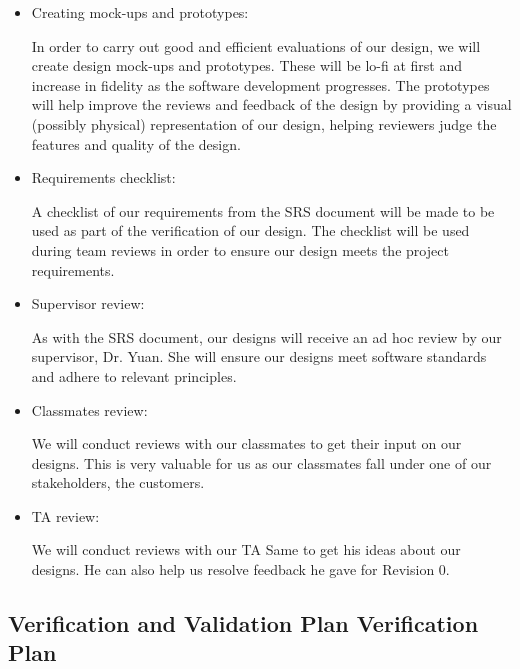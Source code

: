 \documentclass[12pt, titlepage]{article}
\begin{document}
\begin{itemize}
  \item Creating mock-ups and prototypes:

      In order to carry out good and efficient evaluations of our design, we will create design mock-ups and prototypes. These will be lo-fi at first and increase in fidelity as the software development progresses. The prototypes will help improve the reviews and feedback of the design by providing a visual (possibly physical) representation of our design, helping reviewers judge the features and quality of the design.
  
  \item Requirements checklist:

      A checklist of our requirements from the SRS document will be made to be used as part of the verification of our design. The checklist will be used during team reviews in order to ensure our design meets the project requirements.
  
  \item Supervisor review:

      As with the SRS document, our designs will receive an ad hoc review by our supervisor, Dr. Yuan. She will ensure our designs meet software standards and adhere to relevant principles.   

  \item Classmates review:

      We will conduct reviews with our classmates to get their input on our designs. This is very valuable for us as our classmates fall under one of our stakeholders, the customers.
      
  \item TA review:

      We will conduct reviews with our TA Same to get his ideas about our designs. He can also help us resolve feedback he gave for Revision 0.

\end{itemize}

\subsection{Verification and Validation Plan Verification Plan}
\end{document}
